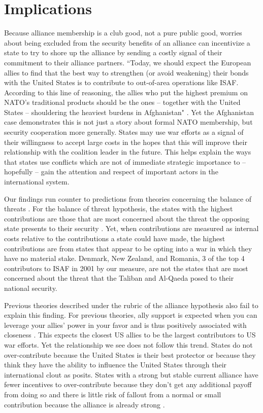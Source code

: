 \documentclass[12pt,letterpaper]{article}
\begin{document}
\section{Implications}
	Because alliance membership is a club good, not a pure public good, worries about being excluded from the security benefits of an alliance can incentivize a state to try to shore up the alliance by sending a costly signal of their commitment to their alliance partners. ``Today, we should expect the European allies to find that the best way to strengthen (or avoid weakening) their bonds with the United States is to contribute to out-of-area operations like ISAF. According to this line of reasoning, the allies who put the highest premium on NATO’s traditional products should be the ones – together with the United States – shouldering the heaviest burdens in Afghanistan" \citep[331]{ringsmose_natoburdensharingredux_2010}. Yet the Afghanistan case demonstrates this is not just a story about formal NATO membership, but security cooperation more generally. States may use war efforts as a signal of their willingness to accept large costs in the hopes that this will improve their relationship with the coalition leader in the future. This helps explain the ways that states use conflicts which are not of immediate strategic importance to -- hopefully -- gain the attention and respect of important actors in the international system.

	Our findings run counter to predictions from theories concerning the balance of threats \citep{walt_originsalliance_1987}. For the balance of threat hypothesis, the states with the highest contributions are those that are most concerned about the threat the opposing state presents to their security \citep{haesebrouck_democraticparticipationair_2016}. Yet, when contributions are measured as internal costs relative to the contributions a state could have made, the highest contributions are from states that appear to be opting into a war in which they have no material stake. Denmark, New Zealand, and Romania, 3 of the top 4 contributors to ISAF in 2001 by our measure, are not the states that are most concerned about the threat that the Taliban and Al-Qaeda posed to their national security.

	Previous theories described under the rubric of the alliance hypothesis also fail to explain this finding. For previous theories, ally support is expected when you can leverage your allies' power in your favor and is thus positively associated with closeness \citep{davidson_neoclassicalrealistexplanation_2011, massie_democraticalliesfollowership_2016}. This expects the closest US allies to be the largest contributors to US war efforts. Yet the relationship we see does not follow this trend. States do not over-contribute because the United States is their best protector or because they think they have the ability to influence the United States through their international clout as \citet{ringsmose_natoburdensharingredux_2010} posits. States with a strong but stable current alliance have fewer incentives to over-contribute because they don't get any additional payoff from doing so and there is little risk of fallout from a normal or small contribution because the alliance is already strong \citep{davidson_headingexitsdemocratic_2014}.
	
\end{document}
